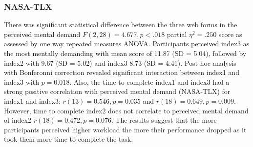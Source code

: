 \documentclass[../main/Feedback.tex]{subfiles}
\begin{document}
		\subsubsection{NASA-TLX}
		There was significant statistical difference between the three web forms in the perceived mental demand $F(2,28)=4.677, p<.018$ partial $\eta^{2}=.250$ score as assessed by one way repeated measures ANOVA. Participants perceived index3 as the most mentally demanding with mean score of 11.87 (SD = 5.04), followed by index2 with 9.67 (SD = 5.02) and index3 8.73 (SD = 4.41). Post hoc analysis with Bonferonni correction revealed significant interaction between index1 and index3 with $p=0.018$.
		Also, the time to complete index1 and index3 had a strong positive correlation with perceived mental demand (NASA-TLX) for index1 and index3: $r(13)=0.546, p=0.035$ and $r(18)=0.649, p=0.009$. However, time to complete index2 does not correlate to perceived mental demand of index2 $r(18)=0.472, p=0.076$. The results suggest that the more participants perceived higher workload the more their performance dropped as it took them more time to complete the task. 
		
%		

		
		
\end{document}
